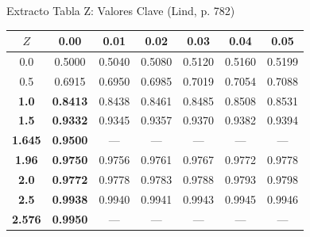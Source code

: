 \documentclass[10pt]{beamer}
\begin{document}
\begin{frame}{Extracto Tabla Z: Valores Clave (Lind, p. 782)}
\begin{center}
\footnotesize
\begin{tabular}{c|cccccc}
\toprule
\rowcolor{celeste}
$Z$ & 0.00 & 0.01 & 0.02 & 0.03 & 0.04 & 0.05 \\
\midrule
0.0 & 0.5000 & 0.5040 & 0.5080 & 0.5120 & 0.5160 & 0.5199 \\
0.5 & 0.6915 & 0.6950 & 0.6985 & 0.7019 & 0.7054 & 0.7088 \\
\rowcolor{verdePastel!30}
\textbf{1.0} & \textbf{0.8413} & 0.8438 & 0.8461 & 0.8485 & 0.8508 & 0.8531 \\
\rowcolor{verdePastel!30}
\textbf{1.5} & \textbf{0.9332} & 0.9345 & 0.9357 & 0.9370 & 0.9382 & 0.9394 \\
\rowcolor{rosaFuerte!30}
\textbf{1.645} & \textbf{0.9500} & --- & --- & --- & --- & --- \\
\rowcolor{rosaFuerte!30}
\textbf{1.96} & \textbf{0.9750} & 0.9756 & 0.9761 & 0.9767 & 0.9772 & 0.9778 \\
\rowcolor{verdePastel!30}
\textbf{2.0} & \textbf{0.9772} & 0.9778 & 0.9783 & 0.9788 & 0.9793 & 0.9798 \\
\rowcolor{verdePastel!30}
\textbf{2.5} & \textbf{0.9938} & 0.9940 & 0.9941 & 0.9943 & 0.9945 & 0.9946 \\
\rowcolor{rosaFuerte!30}
\textbf{2.576} & \textbf{0.9950} & --- & --- & --- & --- & --- \\
\bottomrule
\end{tabular}
\end{center}

\vspace{0.2cm}
\end{frame}
\end{document}
